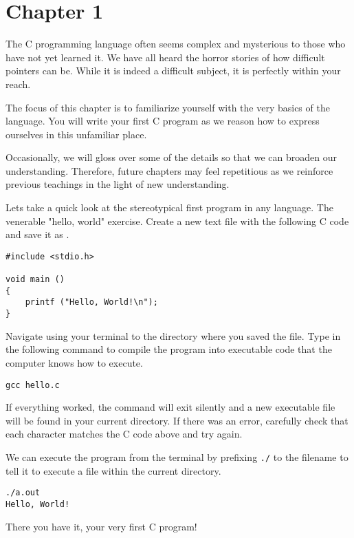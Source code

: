 \chapter{Chapter 1}

The C programming language often seems complex and mysterious to those who have
not yet learned it. We have all heard the horror stories of how difficult
pointers can be. While it is indeed a difficult subject, it is perfectly within
your reach.

The focus of this chapter is to familiarize yourself with the very basics of
the language. You will write your first C program as we reason how to express
ourselves in this unfamiliar place.

Occasionally, we will gloss over some of the details so that we can broaden
our understanding. Therefore, future chapters may feel repetitious as we
reinforce previous teachings in the light of new understanding.

Lets take a quick look at the stereotypical first program in any language. The
venerable "hello, world" exercise. Create a new text file with the following C
code and save it as .

\begin{Verbatim}
#include <stdio.h>

void main ()
{
    printf ("Hello, World!\n");
}
\end{Verbatim}

Navigate using your terminal to the directory where you saved the file. Type
in the following command to compile the program into executable code that the
computer knows how to execute.

\begin{Verbatim}
gcc hello.c
\end{Verbatim}

If everything worked, the  command will exit silently and a new
executable file  will be found in your current directory. If there
was an error, carefully check that each character matches the C code above and
try again.

We can execute the program from the terminal by prefixing \verb|./| to the
filename to tell it to execute a file within the current directory.

\begin{Verbatim}
./a.out
Hello, World!
\end{Verbatim}

There you have it, your very first C program!

